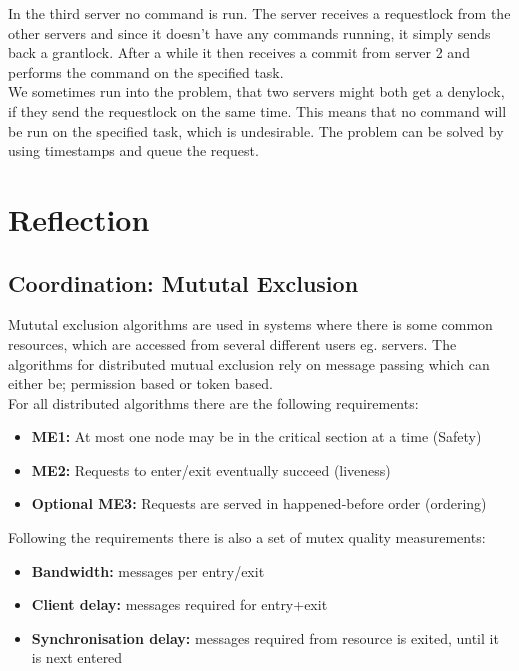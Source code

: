 In the third server no command is run. The server receives a requestlock from the other servers and since it doesn’t have any commands running, it simply sends back a grantlock. After a while it then receives a commit from server 2 and performs the command on the specified task. \\

We sometimes run into the problem, that two servers might both get a denylock, if they send the requestlock on the same time. This means that no command will be run on the specified task, which is undesirable. The problem can be solved by using timestamps and queue the request.

\section{Reflection}
\label{MutualExclusion_motivation}

\subsection{Coordination: Mututal Exclusion}
Mututal exclusion algorithms are used in systems where there is some common resources, which are accessed from several different users eg. servers. The algorithms for distributed mutual exclusion rely on message passing which can either be; permission based or token based. \\

For all distributed algorithms there are the following requirements:
\begin{itemize}
\item \textbf{ME1:} At most one node may be in the critical section at a time (Safety)
\item \textbf{ME2:} Requests to enter/exit eventually succeed 
(liveness)
\item \textbf{Optional ME3:} Requests are served in happened-before 
order (ordering)
\end{itemize} 

Following the requirements there is also a set of mutex quality measurements:
\begin{itemize}
\item \textbf{Bandwidth:} messages per entry/exit
\item \textbf{Client delay:} messages required for entry+exit
\item \textbf{Synchronisation delay:} messages required from resource is exited, until it is next entered
\end{itemize}

